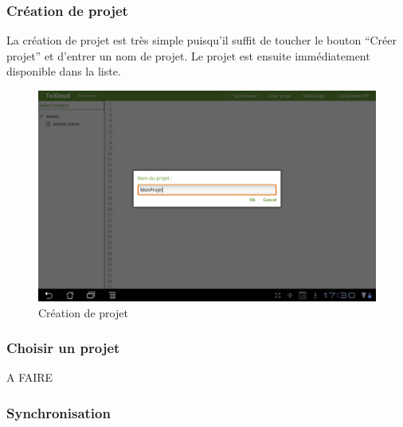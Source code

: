 \documentclass[a4paper,12pt]{article}
\begin{document}
\paragraph*{}

\subsubsection{Création de projet}
La création de projet est très simple puisqu'il suffit de toucher le bouton ``Créer projet'' et d'entrer un nom de projet. Le projet est ensuite immédiatement disponible dans la liste.
\begin{figure}[!ht]
\begin{center}
  \includegraphics[width=1\textwidth]{./images/screenshot/creation_projet.png}
\end{center}
  \caption{Création de projet}
  \label{Création de projet}
\end{figure}
\paragraph*{}

\subsubsection{Choisir un projet}
A FAIRE


\subsubsection{Synchronisation}
\end{document}
